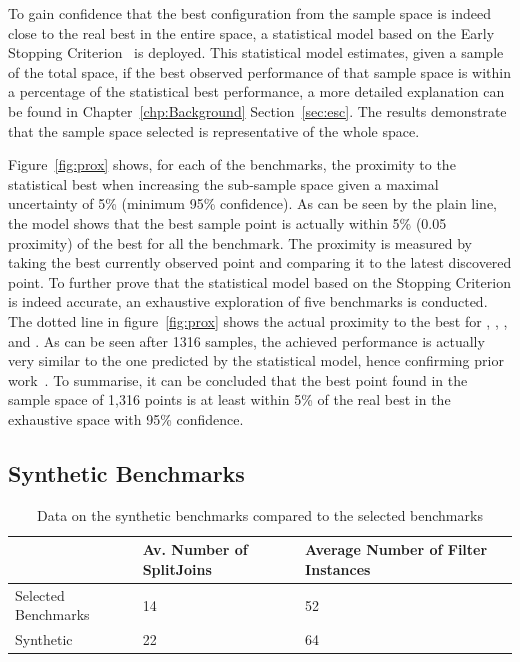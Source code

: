 To gain confidence that the best configuration from the sample space is indeed close to the real best in the entire space, a statistical model based on the Early Stopping Criterion~\cite{vuduc2003AutomaticPerf} is deployed.
This statistical model estimates, given a sample of the total space, if the best observed performance of that sample space is within a percentage of the statistical best performance, a more detailed explanation can be found in Chapter~\ref{chp:Background} Section~\ref{sec:esc}.
The results demonstrate that the sample space selected is representative of the whole space.

Figure~\ref{fig:prox} shows, for each of the benchmarks, the proximity to the statistical best when increasing the sub-sample space given a maximal uncertainty of 5\%  (\ie minimum 95\% confidence).
As can be seen by the plain line, the model shows that the best sample point is actually within 5\% (0.05 proximity) of the best for all the benchmark.
The proximity is measured by taking the best currently observed point and comparing it to the latest discovered point.
To further prove that the statistical model based on the Stopping Criterion is indeed accurate, an exhaustive exploration of five benchmarks is conducted.
The dotted line in figure~\ref{fig:prox} shows the actual proximity to the best for , , ,  and .
As can be seen after 1316 samples, the achieved performance is actually very similar to the one predicted by the statistical model, hence confirming prior work~\cite{vuduc2003AutomaticPerf}.
To summarise, it can be concluded that the best point found in the sample space of 1,316 points is at least within 5\% of the real best in the exhaustive space with 95\% confidence.

\subsection{Synthetic Benchmarks}

\begin{table}[t]
  \small
 \begin{tabular} { | l | l | l | }
 \hline
 & Av. Number of SplitJoins & Average Number of Filter Instances \\ \hline
 Selected Benchmarks & 14 & 52 \\ \hline 
 Synthetic & 22 & 64 \\ \hline
 \end{tabular}
 \caption{Data on the synthetic benchmarks compared to the selected benchmarks}~\label{tab:synthvsreal}
 \end{table}

